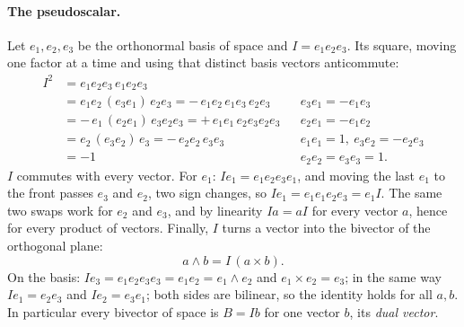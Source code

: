 \paragraph{The pseudoscalar.} Let $e_1, e_2, e_3$ be the orthonormal basis of space and $I = e_1e_2e_3$. Its square, moving one factor at a time and using that distinct basis vectors anticommute:
\begin{align*}
I^2 &= e_1e_2e_3\,e_1e_2e_3 \\
&= e_1e_2\,(e_3e_1)\,e_2e_3 = -\,e_1e_2\,e_1e_3\,e_2e_3 && e_3e_1 = -e_1e_3 \\
&= -\,e_1\,(e_2e_1)\,e_3e_2e_3 = +\,e_1e_1\,e_2e_3e_2e_3 && e_2e_1 = -e_1e_2 \\
&= e_2\,(e_3e_2)\,e_3 = -\,e_2e_2\,e_3e_3 && e_1e_1 = 1,\ e_3e_2 = -e_2e_3 \\
&= -1 && e_2e_2 = e_3e_3 = 1 .
\end{align*}
$I$ commutes with every vector. For $e_1$: $I e_1 = e_1e_2e_3e_1$, and moving the last $e_1$ to the front passes $e_3$ and $e_2$, two sign changes, so $Ie_1 = e_1e_1e_2e_3 = e_1 I$. The same two swaps work for $e_2$ and $e_3$, and by linearity $Ia = aI$ for every vector $a$, hence for every product of vectors. Finally, $I$ turns a vector into the bivector of the orthogonal plane:
\begin{equation*}
a\wedge b = I\,(a\times b) .
\end{equation*}
On the basis: $I e_3 = e_1e_2e_3e_3 = e_1e_2 = e_1\wedge e_2$ and $e_1\times e_2 = e_3$; in the same way $Ie_1 = e_2e_3$ and $Ie_2 = e_3e_1$; both sides are bilinear, so the identity holds for all $a, b$. In particular every bivector of space is $B = Ib$ for one vector $b$, its \emph{dual vector}.

